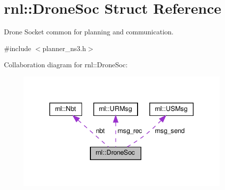 \hypertarget{structrnl_1_1DroneSoc}{}\section{rnl\+:\+:Drone\+Soc Struct Reference}
\label{structrnl_1_1DroneSoc}


Drone Socket common for planning and communication.  




{\ttfamily \#include $<$planner\+\_\+ns3.\+h$>$}



Collaboration diagram for rnl\+:\+:Drone\+Soc\+:\nopagebreak
\begin{figure}[H]
\begin{center}
\leavevmode
\includegraphics[width=299pt]{structrnl_1_1DroneSoc__coll__graph}
\end{center}
\end{figure}
